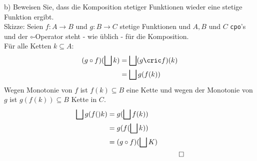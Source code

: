 \documentclass[ngerman,a4paper]{report}
\begin{document}
\begin{compactenum}
\item[b)] Beweisen Sie, dass die Komposition stetiger Funktionen wieder eine stetige Funktion ergibt.\\
Skizze: Seien $f : A \rightarrow B$ und $g : B \rightarrow C$ stetige Funktionen und $A, B$ und $C$ \lstinline!cpo!'s und der $\circ$-Operator steht - wie üblich - für die Komposition.\\
Für alle Ketten $k \subseteq A$:
\begin{align*}
(g \circ f) (\bigsqcup k) &= \bigsqcup (g \cric f) (k) \\
&= \bigsqcup g (f (k)) \\
\end{align*}
Wegen Monotonie von $f$ ist $f(k) \subseteq B$ eine Kette und wegen der Monotonie von $g$ ist $g(f(k)) \subseteq B$ Kette in $C$.
\begin{align*}
\bigsqcup g (f()k) &= g (\bigsqcup f(k))\\
&= g (f (\bigsqcup k))\\
&= (g \circ f) (\bigsqcup K)\\
&& \qed\\
\end{align*}
\end{compactenum}
\end{document}

